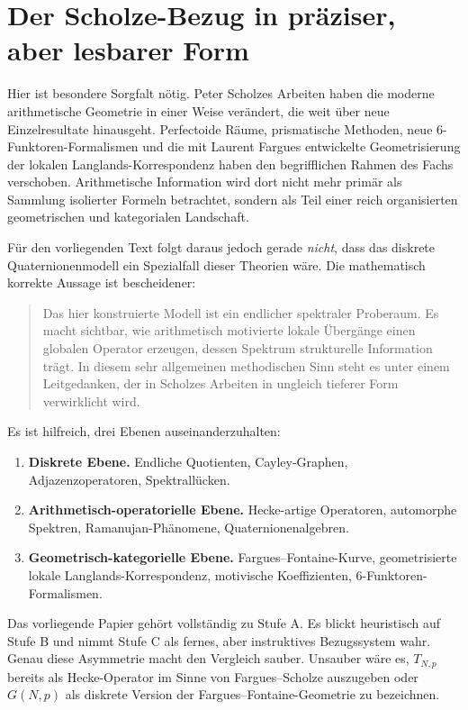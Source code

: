 \documentclass[12pt,a4paper]{article}
\theoremstyle{plain}
\theoremstyle{definition}
\theoremstyle{remark}
\newcommand{\GNp}{G(N,p)}
\newcommand{\TNp}{T_{N,p}}
\begin{document}
\section{Der Scholze-Bezug in präziser, aber lesbarer Form}
Hier ist besondere Sorgfalt nötig. Peter Scholzes Arbeiten haben die moderne arithmetische Geometrie in einer Weise verändert, die weit über neue Einzelresultate hinausgeht. Perfectoide Räume, prismatische Methoden, neue 6-Funktoren-Formalismen und die mit Laurent Fargues entwickelte Geometrisierung der lokalen Langlands-Korrespondenz haben den begrifflichen Rahmen des Fachs verschoben. Arithmetische Information wird dort nicht mehr primär als Sammlung isolierter Formeln betrachtet, sondern als Teil einer reich organisierten geometrischen und kategorialen Landschaft.

Für den vorliegenden Text folgt daraus jedoch gerade \emph{nicht}, dass das diskrete Quaternionenmodell ein Spezialfall dieser Theorien wäre. Die mathematisch korrekte Aussage ist bescheidener:

\begin{quote}
Das hier konstruierte Modell ist ein endlicher spektraler Proberaum. Es macht sichtbar, wie arithmetisch motivierte lokale Übergänge einen globalen Operator erzeugen, dessen Spektrum strukturelle Information trägt. In diesem sehr allgemeinen methodischen Sinn steht es unter einem Leitgedanken, der in Scholzes Arbeiten in ungleich tieferer Form verwirklicht wird.
\end{quote}

Es ist hilfreich, drei Ebenen auseinanderzuhalten:
\begin{enumerate}[label=\textbf{Stufe \Alph*.}]
\item \textbf{Diskrete Ebene.} Endliche Quotienten, Cayley-Graphen, Adjazenzoperatoren, Spektrallücken.
\item \textbf{Arithmetisch-operatorielle Ebene.} Hecke-artige Operatoren, automorphe Spektren, Ramanujan-Phänomene, Quaternionenalgebren.
\item \textbf{Geometrisch-kategorielle Ebene.} Fargues--Fontaine-Kurve, geometrisierte lokale Langlands-Korrespondenz, motivische Koeffizienten, 6-Funktoren-Formalismen.
\end{enumerate}

Das vorliegende Papier gehört vollständig zu Stufe A. Es blickt heuristisch auf Stufe B und nimmt Stufe C als fernes, aber instruktives Bezugssystem wahr. Genau diese Asymmetrie macht den Vergleich sauber. Unsauber wäre es, \(\TNp\) bereits als Hecke-Operator im Sinne von Fargues--Scholze auszugeben oder \(\GNp\) als diskrete Version der Fargues--Fontaine-Geometrie zu bezeichnen.
\end{document}
